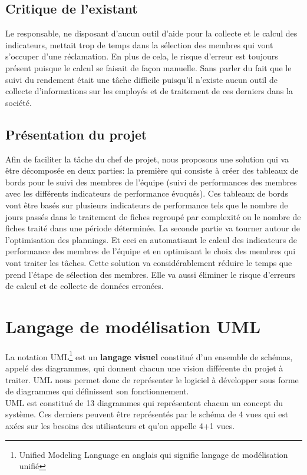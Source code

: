 \subsection{Critique de l'existant}
Le responsable, ne disposant d'aucun outil d'aide pour la collecte et le calcul des indicateurs, mettait trop de temps dans la sélection des membres qui vont s'occuper d'une réclamation. En plus de cela, le risque d'erreur est toujours présent puisque le calcul se faisait de façon manuelle. Sans parler du fait que le suivi du rendement était une tâche difficile puisqu'il n'existe aucun outil de collecte d'informations sur les employés et de traitement de ces derniers dans la société.
\subsection{Présentation du projet}
Afin de faciliter la tâche du chef de projet, nous proposons une solution qui va être décomposée en deux parties: la première qui consiste à créer des tableaux de bords pour le suivi des membres de l'équipe (suivi de performances des membres avec les différents indicateurs de performance évoqués). Ces tableaux de bords vont être basés sur plusieurs indicateurs de performance tels que le nombre de jours passés dans le traitement de fiches regroupé par complexité ou le nombre de fiches traité dans une période déterminée. La seconde partie va tourner autour de l'optimisation des plannings. Et ceci en automatisant le calcul des indicateurs de performance des membres de l'équipe et en optimisant le choix des membres qui vont traiter les tâches.
Cette solution va considérablement réduire le temps que prend l'étape de sélection des membres. Elle va aussi éliminer le risque d’erreurs de calcul et de collecte de données erronées.
\section{Langage de modélisation UML}
La notation UML\footnote{Unified Modeling Language en anglais qui signifie langage de modélisation unifié} est un \textbf{langage visuel} constitué d'un ensemble de schémas, appelé des diagrammes, qui donnent chacun une vision différente du projet à traiter. UML nous permet donc de représenter le logiciel à développer sous forme de diagrammes qui définissent son fonctionnement.\cite{UMLIntroduction}\\

UML est constitué de 13 diagrammes qui représentent chacun un concept du système. Ces derniers peuvent être représentés par le schéma de 4 vues qui est axées sur les besoins des utilisateurs et qu'on appelle 4+1 vues.\\

